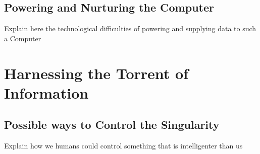 \documentclass[
      12pt,
      a4paper,
      cleardoublepage=empty,
      final,
      twoside
        ]{scrbook}
\begin{document}
    \subsection{Powering and Nurturing the Computer}
      \begin{par}

        Explain here the technological difficulties of powering and supplying data to such a Computer

      \end{par}

      \section{Harnessing the Torrent of Information}
    \subsection{Possible ways to Control the Singularity}
      \begin{par}

        Explain how we humans could control something that is intelligenter than us

      \end{par}



\cleardoubleemptypage

\backmatter

{}


\end{document}
